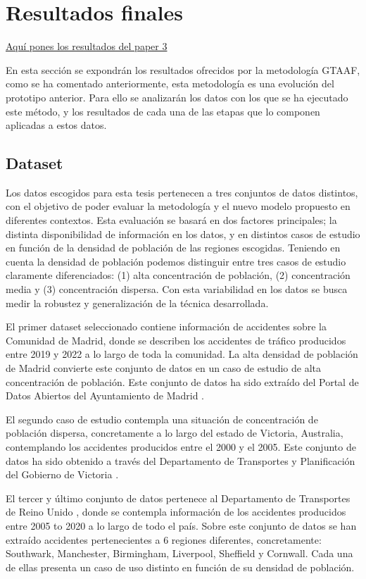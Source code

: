 \documentclass{uathesis-es}
\begin{document}
{\section{Resultados finales}

\underline{Aquí pones los resultados del paper 3}

En esta sección se expondrán los resultados ofrecidos por la metodología GTAAF, como se ha comentado anteriormente, esta metodología es una evolución del prototipo anterior. Para ello se analizarán los datos con los que se ha ejecutado este método, y los resultados de cada una de las etapas que lo componen aplicadas a estos datos.

\subsection{Dataset}

Los datos escogidos para esta tesis pertenecen a tres conjuntos de datos distintos, con el objetivo de poder evaluar la metodología y el nuevo modelo propuesto en diferentes contextos. Esta evaluación se basará en dos factores principales; la distinta disponibilidad de información en los datos, y en distintos casos de estudio en función de la densidad de población de las regiones escogidas. Teniendo en cuenta la densidad de población podemos distinguir entre tres casos de estudio claramente diferenciados: (1) alta concentración de población, (2) concentración media y (3) concentración dispersa. Con esta variabilidad en los datos se busca medir la robustez y generalización de la técnica desarrollada.

El primer dataset seleccionado contiene información de accidentes sobre la Comunidad de Madrid, donde se describen los accidentes de tráfico producidos entre 2019 y 2022 a lo largo de toda la comunidad. La alta densidad de población de Madrid convierte este conjunto de datos en un caso de estudio de alta concentración de población. Este conjunto de datos ha sido extraído del Portal de Datos Abiertos del Ayuntamiento de Madrid \cite{InfoDatasetMadrid}. 

El segundo caso de estudio contempla una situación de concentración de población dispersa, concretamente a lo largo del estado de Victoria, Australia, contemplando los accidentes producidos entre el 2000 y el 2005. Este conjunto de datos ha sido obtenido a través del Departamento de Transportes y Planificación del Gobierno de Victoria \cite{InfoDatasetVictoria}.

El tercer y último conjunto de datos pertenece al Departamento de Transportes de Reino Unido \cite{DatasetUK}, donde se contempla información de los accidentes producidos entre 2005 to 2020 a lo largo de todo el país. Sobre este conjunto de datos se han extraído accidentes pertenecientes a 6 regiones diferentes, concretamente: Southwark, Manchester, Birmingham, Liverpool, Sheffield y Cornwall. Cada una de ellas presenta un caso de uso distinto en función de su densidad de población. 


}
\end{document}
